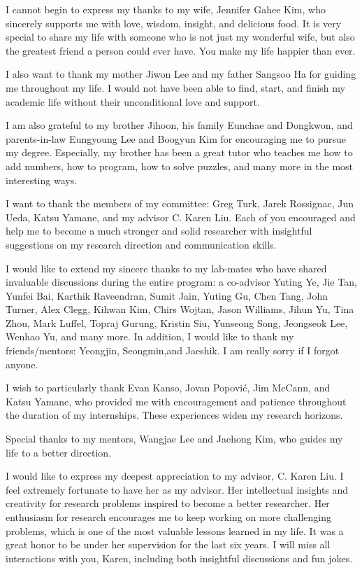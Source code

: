 I cannot begin to express my thanks to my wife, Jennifer Gahee Kim,
who sincerely supports me with love, wisdom, insight, and delicious food.
It is very special to share my life with someone who is not just my wonderful
wife, but also the greatest friend a person could ever have.
You make my life happier than ever.

I also want to thank my mother Jiwon Lee and my father Sangsoo Ha for 
guiding me throughout my life.
I would not have been able to find, start, and finish my academic life without
their unconditional love and support.

I am also grateful to my brother Jihoon, his family Eunchae and Dongkwon,
and parents-in-law Eungyoung Lee and Boogyun Kim for encouraging me to pursue
my degree.
Especially, my brother has been a great tutor who teaches me
how to add numbers, how to program, how to solve puzzles, and many more
in the most interesting ways.

I want to thank the members of my committee: Greg Turk, Jarek Rossignac,
Jun Ueda, Katsu Yamane, and my advisor C. Karen Liu.
Each of you encouraged and help me to become a much stronger and solid
researcher with insightful suggestions on my research direction and
communication skills.

I would like to extend my sincere thanks to my lab-mates
who have shared invaluable discussions during the entire program:
a co-advisor Yuting Ye, Jie Tan, Yunfei Bai, Karthik Raveendran, 
Sumit Jain, Yuting Gu, Chen Tang, John Turner, Alex Clegg, Kihwan Kim, 
Chirs Wojtan, Jason Williams, Jihun Yu, Tina Zhou, Mark Luffel, 
Topraj Gurung, Kristin Siu, Yunseong Song,
Jeongseok Lee, Wenhao Yu, and many more.
In addition, I would like to thank my friends/mentors: Yeongjin, Seongmin,and Jaeshik.
I am really sorry if I forgot anyone.

I wish to particularly thank Evan Kanso, Jovan Popovi\'{c}, Jim McCann, and
Katsu Yamane, who provided me with encouragement and patience throughout the
duration of my internships. These experiences widen my research horizons.

Special thanks to my mentors, Wangjae Lee and Jaehong Kim, who
guides my life to a better direction.

I would like to express my deepest appreciation to my advisor, C. Karen Liu.
I feel extremely fortunate to have her as my advisor.
Her intellectual insights and creativity for research problems
inspired to become a better researcher.
Her enthusiasm for research encourages me to keep working on more challenging
problems, which is one of the most valuable lessons learned in my life.
It was a great honor to be under her supervision for the last six years.
I will miss all interactions with you, Karen, 
including both insightful discussions and fun jokes. 












